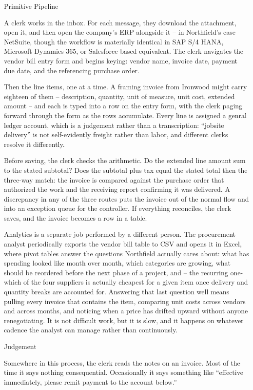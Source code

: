 \documentclass[conference]{IEEEtran}
\begin{document}
Primitive Pipeline 

A clerk works in the inbox. For each message, they download the attachment, open it, and then open the company’s ERP alongside it – in Northfield’s case NetSuite, though the workflow is materially identical in SAP S/4 HANA, Microsoft Dynamics 365, or Salesforce-based equivalent. The clerk navigates the vendor bill entry form and begins keying: vendor name, invoice date, payment due date, and the referencing purchase order.  

Then the line items, one at a time. A framing invoice from Ironwood might carry eighteen of them – description, quantity, unit of measure, unit cost, extended amount – and each is typed into a row on the entry form, with the clerk paging forward through the form as the rows accumulate. Every line is assigned a genral ledger account, which is a judgement rather than a transcription: “jobsite delivery” is not self-evidently freight rather than labor, and different clerks resolve it differently. 

Before saving, the clerk checks the arithmetic. Do the extended line amount sum to the stated subtotal? Does the subtotal plus tax equal the stated total then the three-way match: the invoice is compared against the purchase order that authorized the work and the receiving report confirming it was delivered. A discrepancy in any of the three routes puts the invoice out of the normal flow and into an exception queue for the controller. If everything reconciles, the clerk saves, and the invoice becomes a row in a table. 

Analytics is a separate job performed by a different person. The procurement analyst periodically exports the vendor bill table to CSV and opens it in Excel, where pivot tables answer the questions Northfield actually cares about: what has spending looked like month over month, which categories are growing, what should be reordered before the next phase of a project, and – the recurring one- which of the four suppliers is actually cheapest for a given item once delivery and quantity breaks are accounted for. Answering that last question well means pulling every invoice that contains the item, comparing unit costs across vendors and across months, and noticing when a price has drifted upward without anyone renegotiating. It is not difficult work, but it is slow, and it happens on whatever cadence the analyst can manage rather than continuously. 

Judgement 

Somewhere in this process, the clerk reads the notes on an invoice. Most of the time it says nothing consequential. Occasionally it says something like “effective immediately, please remit payment to the account below.” 
\end{document}
